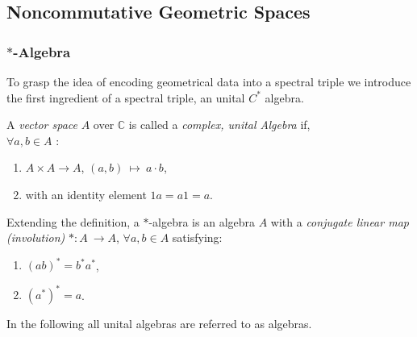 \subsection{Noncommutative Geometric Spaces}
\subsubsection{$*$-Algebra}
To grasp the idea of encoding geometrical data into a spectral triple we
introduce the first ingredient of a spectral triple, an unital $C^*$ algebra.
\begin{definition}
    A \textit{vector space} $A$ over $\mathbb{C}$ is called a \textit{complex, unital Algebra} if, \\
    $\forall a,b \in A$ :
    \begin{enumerate}
        \item
            $A \times A \rightarrow A$,
            $(a, b)\ \mapsto \ a\cdot b$,
        \item with an identity element
            $1a = a1 =a$.
    \end{enumerate}
    Extending the definition, a $*$-algebra is an algebra $A$ with a \textit{conjugate linear map (involution)} $*:A\ \rightarrow  A$,
    $\forall a, b \in A$ satisfying:
    \begin{enumerate}
        \item
            $(ab)^* = b^*a^*$,
        \item
            $(a^*)^* = a$.
    \end{enumerate}
\end{definition}
In the following all unital algebras are referred to as algebras.

